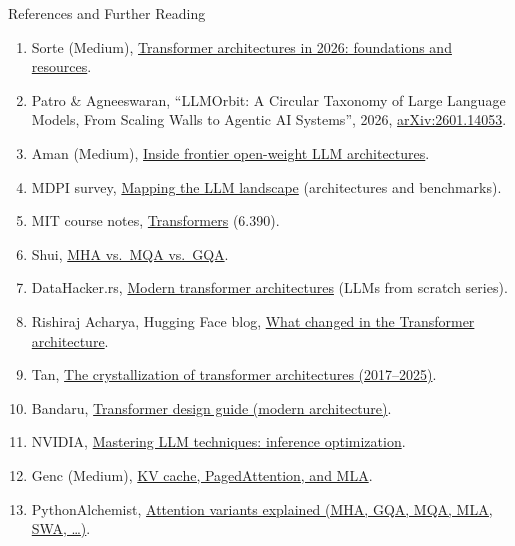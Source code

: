 \begin{frame}[allowframebreaks,t]{References and Further Reading}
\begin{enumerate}
    \item Sorte (Medium), \href{https://medium.com/@angelosorte1/transformer-architectures-in-2026-foundations-code-and-practical-resources-88022b521369}{Transformer architectures in 2026: foundations and resources}.
    \item Patro \& Agneeswaran, ``LLMOrbit: A Circular Taxonomy of Large Language Models, From Scaling Walls to Agentic AI Systems'', 2026, \href{https://arxiv.org/abs/2601.14053}{arXiv:2601.14053}.
    \item Aman (Medium), \href{https://medium.com/@yugank.aman/inside-the-architecture-of-every-frontier-model-what-22-open-weight-llms-reveal-b054ae601980}{Inside frontier open-weight LLM architectures}.
    \item MDPI survey, \href{https://www.mdpi.com/2673-2688/7/4/142}{Mapping the LLM landscape} (architectures and benchmarks).
    \item MIT course notes, \href{https://introml.mit.edu/notes/transformers.html}{Transformers} (6.390).
    \item Shui, \href{https://syhya.github.io/posts/2025-01-16-group-query-attention/}{MHA vs.\ MQA vs.\ GQA}.
    \item DataHacker.rs, \href{https://datahacker.rs/llms-from-scratch-003-modern-transformer-architectures-a-deep-dive-into-design-principles-and-training}{Modern transformer architectures} (LLMs from scratch series).
    \item Rishiraj Acharya, Hugging Face blog, \href{https://huggingface.co/blog/rishiraj/what-changed-in-the-transformer-architecture}{What changed in the Transformer architecture}.
    \item Tan, \href{https://jytan.net/blog/2025/transformer-architectures/}{The crystallization of transformer architectures (2017--2025)}.
    \item Bandaru, \href{https://rohitbandaru.github.io/blog/Transformer-Design-Guide-Pt2/}{Transformer design guide (modern architecture)}.
    \item NVIDIA, \href{https://developer.nvidia.com/blog/mastering-llm-techniques-inference-optimization/}{Mastering LLM techniques: inference optimization}.
    \item Genc (Medium), \href{https://medium.com/@mustafa.gencc94/transformers-llms-part-13-kv-cache-pagedattention-and-mla-e9cec8744345}{KV cache, PagedAttention, and MLA}.
    \item PythonAlchemist, \href{https://www.pythonalchemist.com/llm-architectures/attention-variants}{Attention variants explained (MHA, GQA, MQA, MLA, SWA, \ldots)}.

\end{enumerate}
\end{frame}
